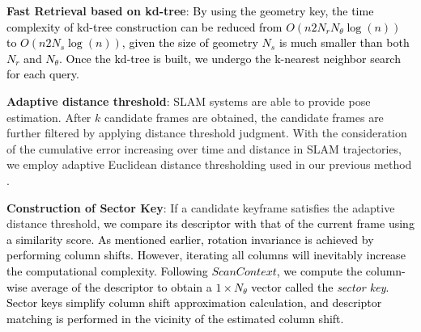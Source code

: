 \documentclass[letterpaper, 10 pt, conference]{ieeeconf}   %
\newcommand\kevin[1]{\textcolor{black}{#1}}
\begin{document}
\textbf{Fast Retrieval based on kd-tree}: 
\kevin{By using the geometry key, the time complexity of kd-tree construction can be reduced from $O(n2N_r N_{\theta} \log(n))$ to $O(n2N_s \log(n))$, given the size of geometry $N_s$ is much smaller than both $N_r$ and $N_{\theta}$.}
\kevin{Once the kd-tree is built, we undergo the k-nearest neighbor search for each query. }

\textbf{Adaptive distance threshold}: 
SLAM systems are able to provide pose estimation. After $k$ candidate frames are obtained, the candidate frames are further filtered by applying distance threshold judgment. With the consideration of the cumulative error increasing over time and distance in SLAM trajectories, we employ adaptive Euclidean distance thresholding used in our previous method \cite{opscf}.


\textbf{Construction of Sector Key}: If a candidate keyframe satisfies the adaptive distance threshold, \kevin{we compare its descriptor with that of the current frame using a similarity score. As mentioned earlier, rotation invariance is achieved by performing column shifts. However, iterating all columns will inevitably increase the computational complexity. Following $Scan Context$, we compute the column-wise average of the descriptor to obtain a $1 \times N_{\theta}$ vector called the \emph{sector key}.
Sector keys simplify column shift approximation calculation, and descriptor matching is performed in the vicinity of the estimated column shift.}
\end{document}
